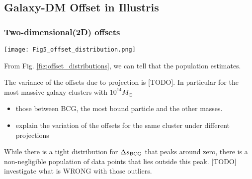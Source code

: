 \subsection{Galaxy-DM Offset in Illustris}

\subsubsection{Two-dimensional(2D) offsets}
\begin{figure*}
	\begin{center}
	\texttt{[image: Fig5\_offset\_distribution.png]}
	\caption{ 		
		The distribution of different offsets of [TODO] clusters with [TODO]
		projections. The dark blue area indicates the 68\% confidence interval
		while the light blue area shows the 95\% confidence interval. 
		We plot the offset after taking the
		absolute magnitude, which  
		The estimates from the absolute magnitude of the
		offsets are pushed towards larger values. 				
		\label{fig:offset_distributions}
	}
\end{center}
\end{figure*}

From Fig. \ref{fig:offset_distributions}, we can tell that the population 
estimates. 

The variance of the offsets due to projection is [TODO].
In particular for the most massive galaxy clusters with $10^{14} M_{\odot}$



\begin{itemize}
\item those between BCG, the most bound particle and the other masses. 
\item explain the variation of the offsets for the same cluster under different 
projections 
\end{itemize}

While there is a tight distribution for $\Delta s_{\rm BCG}$ that peaks around
zero, there is a non-negligible population of data points that lies outside
this peak. 
[TODO] investigate what is WRONG with those outliers.

